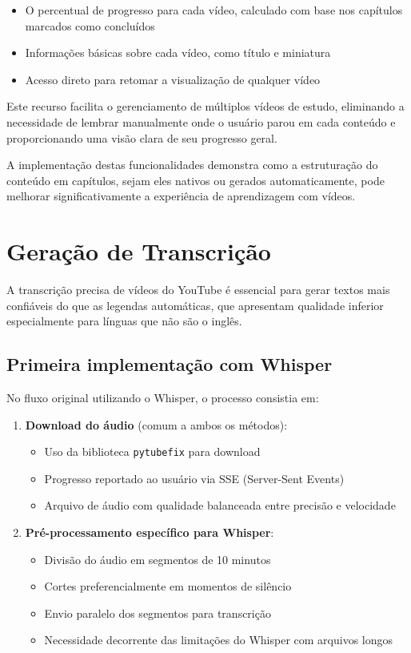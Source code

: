 \documentclass[tcc,capa]{texufpel}
\begin{document}
\begin{itemize}
    \item O percentual de progresso para cada vídeo, calculado com base nos capítulos marcados como concluídos
    \item Informações básicas sobre cada vídeo, como título e miniatura
    \item Acesso direto para retomar a visualização de qualquer vídeo
\end{itemize}

Este recurso facilita o gerenciamento de múltiplos vídeos de estudo, eliminando a necessidade de lembrar manualmente onde o usuário parou em cada conteúdo e proporcionando uma visão clara de seu progresso geral.

A implementação destas funcionalidades demonstra como a estruturação do conteúdo em capítulos, sejam eles nativos ou gerados automaticamente, pode melhorar significativamente a experiência de aprendizagem com vídeos.

\section{Geração de Transcrição}

A transcrição precisa de vídeos do YouTube é essencial para gerar textos mais confiáveis do que as legendas automáticas, que apresentam qualidade inferior especialmente para línguas que não são o inglês.

\subsection{Primeira implementação com Whisper}

No fluxo original utilizando o Whisper, o processo consistia em:

\begin{enumerate}
    \item \textbf{Download do áudio} (comum a ambos os métodos):
    \begin{itemize}
        \item Uso da biblioteca \texttt{pytubefix} para download
        \item Progresso reportado ao usuário via SSE (Server-Sent Events)
        \item Arquivo de áudio com qualidade balanceada entre precisão e velocidade
    \end{itemize}

    \item \textbf{Pré-processamento específico para Whisper}:
    \begin{itemize}
        \item Divisão do áudio em segmentos de 10 minutos
        \item Cortes preferencialmente em momentos de silêncio
        \item Envio paralelo dos segmentos para transcrição
        \item Necessidade decorrente das limitações do Whisper com arquivos longos
    \end{itemize}
\end{enumerate}
\end{document}
